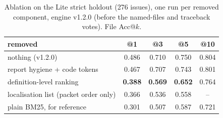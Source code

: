 \begin{table}[t]
\centering
\small
\caption{Ablation on the Lite strict holdout (276 issues), one run per removed component, engine
v1.2.0 (before the named-files and traceback votes). File Acc@$k$.}
\label{tab:ablation}
\begin{tabular}{@{}lcccc@{}}
\toprule
removed & @1 & @3 & @5 & @10\\
\midrule
nothing (v1.2.0) & 0.486 & 0.710 & 0.750 & 0.804\\
report hygiene + code tokens & 0.467 & 0.707 & 0.743 & 0.801\\
definition-level ranking & \textbf{0.388} & \textbf{0.569} & \textbf{0.652} & 0.764\\
localisation list (packet order only) & 0.366 & 0.536 & 0.558 & --\\
\midrule
plain BM25, for reference & 0.301 & 0.507 & 0.587 & 0.721\\
\bottomrule
\end{tabular}
\end{table}
